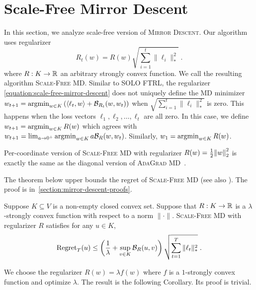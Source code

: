 \section{Scale-Free Mirror Descent}
\label{section:mirror-descent}

In this section, we analyze scale-free version of \textsc{Mirror Descent}.
Our algorithm uses regularizer
\begin{equation}
\label{equation:scale-free-mirror-descent}
R_t(w) = R(w) \sqrt{\sum_{i=1}^t \|\ell_i\|_*^2} \; .
\end{equation}
where $R:K \to \mathbb{R}$ an arbitrary strongly convex function.
We call the resulting algorithm \textsc{Scale-Free MD}.
Similar to \textsc{SOLO FTRL}, the regularizer
\eqref{equation:scale-free-mirror-descent} does not uniquely define
the \textsc{MD} minimizer
$w_{t+1} = \operatorname*{argmin}_{w \in K} \left(\langle \ell_t, w \rangle + \mathcal{B}_{R_t}(w,
w_t) \right)$ when $\sqrt{\sum_{i=1}^t \|\ell_i\|_*^2}$ is zero.
This happens when the loss vectors $\ell_1, \ell_2, \dots, \ell_t$ are all
zero. In this case, we define
$w_{t+1} = \operatorname*{argmin}_{w \in K} R(w)$ which agrees with
$w_{t+1} = \lim_{a \to 0^+} \operatorname*{argmin}_{w \in K} a \mathcal{B}_{R}(w, w_t)$.
Similarly, $w_1 = \operatorname*{argmin}_{w \in K} R(w)$.

Per-coordinate version of \textsc{Scale-Free MD} with regularizer $R(w) =
\frac{1}{2}{\left\|{w}\right\|}_2^2$ is exactly the same as the diagonal version of
\textsc{AdaGrad MD}~\cite{Duchi-Hazan-Singer-2011}.

The theorem below upper bounds the regret of \textsc{Scale-Free MD} (see also
\cite{Duchi-Hazan-Singer-2011, Duchi-Shalev-Shwartz-Singer-Tewari-2010,
Rakhlin-Sridharan-2013}).  The proof is in~\ref{section:mirror-descent-proofs}.

\begin{theorem}
\label{theorem:regret-scale-free-mirror-descent}
Suppose $K \subseteq V$ is a non-empty closed convex set. Suppose that $R:K
\to \mathbb{R}$ is a $\lambda$-strongly convex function with respect to a norm
$\|\cdot\|$.  \textsc{Scale-Free MD} with regularizer $R$ satisfies
for any $u \in K$,
$$
\operatorname{Regret}_T(u)
\le
\left( \frac{1}{\lambda} + \sup_{v \in K} \mathcal{B}_R(u,v) \right) \sqrt{\sum_{t=1}^T \|\ell_t\|_*^2} \; .
$$
\end{theorem}

We choose the regularizer $R(w) = \lambda f(w)$ where $f$ is a $1$-strongly convex
function and optimize $\lambda$. The result is the following Corollary. Its
proof is trivial.

